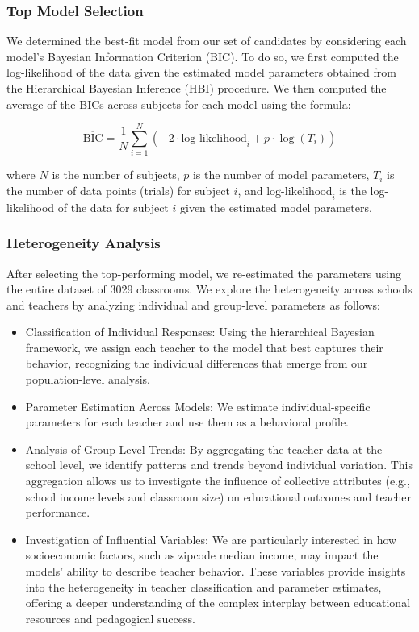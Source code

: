 \documentclass[
  number,
  preprint,
  3p,
  onecolumn]{elsarticle}
\begin{document}
\subsubsection{Top Model Selection}\label{top-model-selection-1}

We determined the best-fit model from our set of candidates by
considering each model's Bayesian Information Criterion (BIC). To do so,
we first computed the log-likelihood of the data given the estimated
model parameters obtained from the Hierarchical Bayesian Inference (HBI)
procedure. We then computed the average of the BICs across subjects for
each model using the formula:

\[
\overline{\text{BIC}} = \frac{1}{N} \sum_{i=1}^{N} \left( -2 \cdot \text{log-likelihood}_i + p \cdot \log(T_i) \right)
\]

where \(N\) is the number of subjects, \(p\) is the number of model
parameters, \(T_i\) is the number of data points (trials) for subject
\(i\), and \(\text{log-likelihood}_i\) is the log-likelihood of the data
for subject \(i\) given the estimated model parameters.

\subsubsection{Heterogeneity Analysis}\label{heterogeneity-analysis}

After selecting the top-performing model, we re-estimated the parameters
using the entire dataset of 3029 classrooms. We explore the
heterogeneity across schools and teachers by analyzing individual and
group-level parameters as follows:

\begin{itemize}
\item
  Classification of Individual Responses: Using the hierarchical
  Bayesian framework, we assign each teacher to the model that best
  captures their behavior, recognizing the individual differences that
  emerge from our population-level analysis.
\item
  Parameter Estimation Across Models: We estimate individual-specific
  parameters for each teacher and use them as a behavioral profile.
\item
  Analysis of Group-Level Trends: By aggregating the teacher data at the
  school level, we identify patterns and trends beyond individual
  variation. This aggregation allows us to investigate the influence of
  collective attributes (e.g., school income levels and classroom size)
  on educational outcomes and teacher performance.
\item
  Investigation of Influential Variables: We are particularly interested
  in how socioeconomic factors, such as zipcode median income, may
  impact the models' ability to describe teacher behavior. These
  variables provide insights into the heterogeneity in teacher
  classification and parameter estimates, offering a deeper
  understanding of the complex interplay between educational resources
  and pedagogical success.
\end{itemize}
\end{document}
